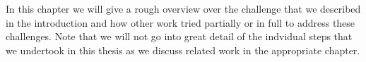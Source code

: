 In this chapter we will give a rough overview over the challenge that we described in the introduction and how other work tried partially or in full to address these challenges.
Note that we will not go into great detail of the indvidual steps that we undertook in this thesis as we discuss related work in the appropriate chapter.
